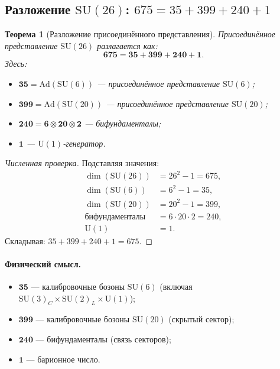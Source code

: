 \documentclass[11pt,a4paper]{article}
\newcommand{\SU}{\mathrm{SU}}
\newcommand{\Ad}{\mathrm{Ad}}
\newtheorem{theorem}{Теорема}[section]
\theoremstyle{definition}
\begin{document}
\subsection{Разложение $\SU(26)$: $675 = 35 + 399 + 240 + 1$}
\label{subsec:su26-decomposition}

\begin{theorem}[Разложение присоединённого представления]
\label{thm:adjoint-decomposition}
Присоединённое представление $\SU(26)$ разлагается как:
\begin{equation}
    \boxed{
    \mathbf{675} = \mathbf{35} + \mathbf{399} + \mathbf{240} + \mathbf{1}.
    }
    \label{eq:675-decomposition}
\end{equation}
Здесь:
\begin{itemize}
    \item $\mathbf{35} = \Ad(\SU(6))$ — присоединённое 
          представление $\SU(6)$;
    \item $\mathbf{399} = \Ad(\SU(20))$ — присоединённое 
          представление $\SU(20)$;
    \item $\mathbf{240} = \mathbf{6} \otimes \mathbf{20} 
          \otimes \mathbf{2}$ — бифундаменталы;
    \item $\mathbf{1}$ — $\mathrm{U}(1)$-генератор.
\end{itemize}
\end{theorem}

\begin{proof}[Численная проверка]
Подставляя значения:
\begin{align}
    \dim(\SU(26)) &= 26^2 - 1 = 675, \\
    \dim(\SU(6)) &= 6^2 - 1 = 35, \\
    \dim(\SU(20)) &= 20^2 - 1 = 399, \\
    \text{бифундаменталы} &= 6 \cdot 20 \cdot 2 = 240, \\
    \mathrm{U}(1) &= 1.
\end{align}
Складывая: $35 + 399 + 240 + 1 = 675$. \checkmark
\end{proof}

\paragraph{Физический смысл.}
\begin{itemize}
    \item $\mathbf{35}$ — калибровочные бозоны $\SU(6)$ 
          (включая $\SU(3)_C \times \SU(2)_L \times \mathrm{U}(1)$);
    \item $\mathbf{399}$ — калибровочные бозоны $\SU(20)$ 
          (скрытый сектор);
    \item $\mathbf{240}$ — бифундаменталы (связь секторов);
    \item $\mathbf{1}$ — барионное число.
\end{itemize}
\end{document}
